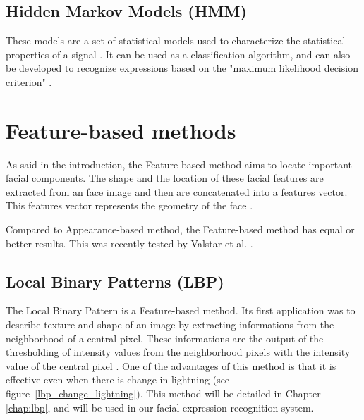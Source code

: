 \subsection{Hidden Markov Models (HMM)}

\vspace{\baselineskip}
\noindent These models are a set of statistical models used to characterize the statistical properties of a signal \cite{RAB93}. It can be used as a classification algorithm, and can also be developed to recognize expressions based on the "maximum likelihood decision criterion" \cite{LIE98}.
\newline

\section{Feature-based methods}

\noindent As said in the introduction, the Feature-based method aims to locate important facial components. The shape and the location of these facial features are extracted from an face image and then are concatenated into a features vector. This features vector represents the geometry of the face \cite{SHA09}.
\newline

\noindent Compared to Appearance-based method, the Feature-based method has equal or better results. This was recently tested by Valstar et al. \cite{VAL05} \cite{VAL06}.
\newline

\subsection{Local Binary Patterns (LBP)}

\vspace{\baselineskip}
\noindent The Local Binary Pattern is a Feature-based method. Its first application was to describe texture and shape of an image by extracting informations from the neighborhood of a central pixel. These informations are the output of the thresholding of intensity values from the neighborhood pixels with the intensity value of the central pixel \cite{GAN08}. One of the advantages of this method is that it is effective even when there is change in lightning (see figure~\ref{lbp_change_lightning}). This method will be detailed in Chapter \ref{chap:lbp}, and will be used in our facial expression recognition system.
\newline

